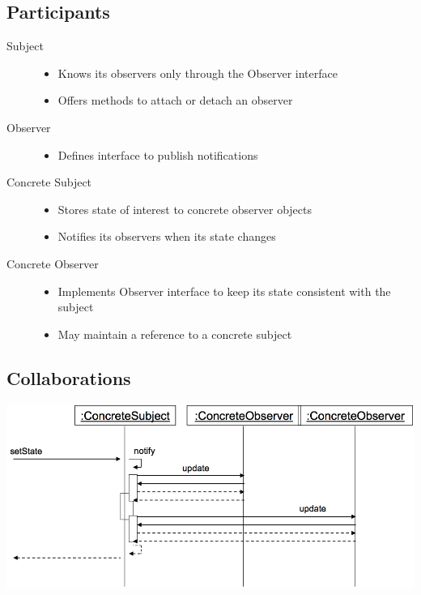 \documentclass[a4paper, 11pt]{article}
\begin{document}
\subsection{Participants}
\begin{description}
	\item[Subject] \hfill
		\begin{itemize}
			\item Knows its observers only through the Observer interface
			\item Offers methods to attach or detach an observer
		\end{itemize}
	\item[Observer] \hfill
		\begin{itemize}
			\item Defines interface to publish notifications
		\end{itemize}
	\item[Concrete Subject] \hfill
		\begin{itemize}
			\item Stores state of interest to concrete observer objects
			\item Notifies its observers when its state changes
		\end{itemize}
	\item[Concrete Observer] \hfill
		\begin{itemize}
			\item Implements Observer interface to keep its state consistent with the subject
			\item May maintain a reference to a concrete subject
		\end{itemize}
\end{description}

\subsection{Collaborations}
\begin{center}
	\includegraphics[scale=0.3]{observer-collaborations.png}
\end{center}
\end{document}
